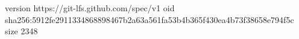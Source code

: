 version https://git-lfs.github.com/spec/v1
oid sha256:5912fe2911334868898467b2a63a561fa53b4b365f430ea4b73f38658e794f5c
size 2348
